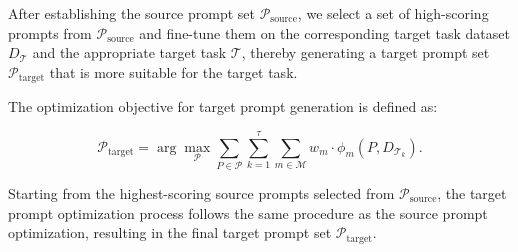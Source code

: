 After establishing the source prompt set $\mathcal{P}_{\text{source}}$, we select a set of high-scoring prompts from $\mathcal{P}_{\text{source}}$ and fine-tune them on the corresponding target task dataset $D_{\mathcal{T}}$ and the appropriate target task $\bm{\mathcal{T}}$, thereby generating a target prompt set $\mathcal{P}_{\text{target}}$ that is more suitable for the target task.

The optimization objective for target prompt generation is defined as:

\begin{equation}
\mathcal{P}_{\text{target}} = \arg\max_{\mathcal{P}} \sum_{P \in \mathcal{P}} \sum_{k=1}^\tau \sum_{m \in \mathcal{M}} w_m \cdot \phi_m(P, D_{\mathcal{T}_k}).
\label{eq:target_opt_multi_metric}
\end{equation}

Starting from the highest-scoring source prompts selected from $\mathcal{P}_{\text{source}}$, the target prompt optimization process follows the same procedure as the source prompt optimization, resulting in the final target prompt set $\mathcal{P}_{\text{target}}$.










